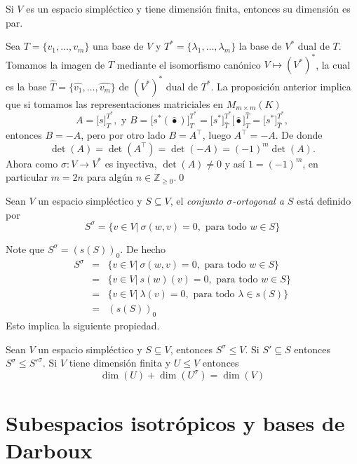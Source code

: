 \begin{pro}
Si $V$ es un espacio simpl\'ectico y tiene dimensi\'on finita, entonces su dimensi\'on es par. 
\end{pro}

\dem Sea $T=\{v_1,\ldots,v_m\}$ una base de $V$ y $T^*=\{\lambda_1,\ldots,\lambda_m\}$ la base de $V^*$ dual de $T$. Tomamos la imagen de $T$ mediante el isomorfismo can\'onico $V\mapsto \left(V^*\right)^*$, la cual es la base $\widehat{T}=\{\widehat{v_1},\ldots,\widehat{v_m}\}$ de $\left(V^*\right)^*$ dual de $T^*$. La proposici\'on anterior implica que si tomamos las representaciones matriciales en $M_{m\times m}(K)$
\[
A=\Big[s\Big]^{T^*}_T,\textrm{ y } B=\Big[s^*(\widehat{\bullet})\Big]^{T^*}_{T}=\Big[s^*\Big]^{T^*}_{\widehat{T}}\Big[\widehat{\bullet}\Big]^{\widehat{T}}_T=\Big[s^*\Big]^{T^*}_{\widehat{T}}, 
\]
entonces $B=-A$, pero por otro lado $B=A^\intercal$, luego $A^\intercal=-A$. De donde
\[
\det(A)=\det(A^\intercal)=\det(-A)=(-1)^m\det(A).
\]
Ahora como $\sigma: V\rightarrow V^*$ es inyectiva, $\det(A)\ne 0$ y as\'i $1=(-1)^m$, en particular $m=2n$ para alg\'un $n\in\mathbb{Z}_{\ge 0}$.\qed

\begin{defn}
Sean $V$ un espacio simpl\'ectico y $S\subseteq V$, el \emph{conjunto $\sigma$-ortogonal a $S$} est\'a definido por
\[
S^\sigma=\{v\in V|\ \sigma(w,v)=0, \textrm{ para todo } w\in S\}
\]
\end{defn}

\begin{obs}
Note que $S^\sigma=(s(S))_0$. De hecho
\begin{eqnarray*}
S^\sigma & = & \{v\in V|\ \sigma(w,v)=0, \textrm{ para todo } w\in S\}\\
  & = & \{v\in V|\ s(w)(v)=0,\textrm{ para todo } w\in S\}\\
  & = & \{v\in V|\ \lambda(v)=0,\textrm{ para todo } \lambda\in s(S)\}\\
  & = & (s(S))_0  
\end{eqnarray*}
Esto implica la siguiente propiedad.
\end{obs}

\begin{pro}\label{ortsubespsimp}
Sean $V$ un espacio simpl\'ectico y $S\subseteq V$, entonces $S^\sigma\le V$. Si $S'\subseteq S$ entonces $S^\sigma\le S'^\sigma$. Si $V$ tiene dimensi\'on finita y $U\le V$ entonces
\[
\dim(U)+\dim (U^\sigma)=\dim(V)
\]
\end{pro}

\section{Subespacios isotr\'opicos y bases de Darboux}

